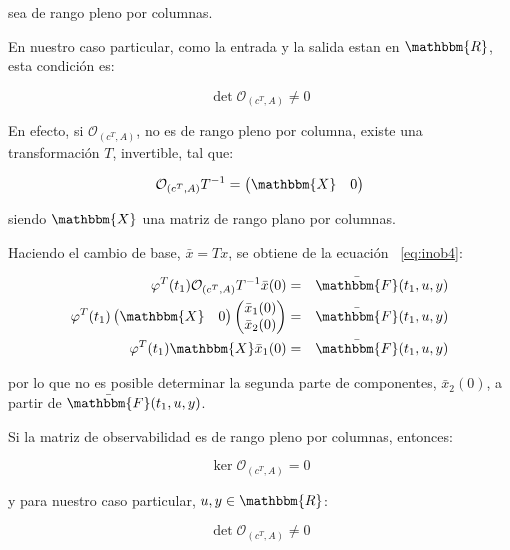 	sea de rango pleno por columnas.

	En nuestro caso particular, como la entrada y la salida estan en $\mathbbm{R}$, esta condición es:

	\begin{equation*}
		\det{\mathcal{O}_{(c^T, A)}} \ne 0
	\end{equation*}

	En efecto, si $\mathcal{O}_{(c^T, A)}$, no es de rango pleno por columna, existe una transformación $T$, invertible, tal que:

	\begin{equation*}
		\mathcal{O}_{(c^T, A)} T^{-1} =
		\begin{pmatrix}
			\mathbbm{X} & 0
		\end{pmatrix}
	\end{equation*}

	siendo $\mathbbm{X}$ una matriz de rango plano por columnas.

	Haciendo el cambio de base, $\bar{x} = T x$, se obtiene de la ecuación ~\ref{eq:inob4}:

	\begin{eqnarray*}
		\varphi^T(t_1) \mathcal{O}_{(c^T, A)} T^{-1} \bar{x}(0) & = & \bar{\mathbbm{F}}(t_1, u, y) \\
		\varphi^T(t_1)
		\begin{pmatrix}
		 	\mathbbm{X} & 0
		\end{pmatrix}
		\begin{pmatrix}
		 	\bar{x}_1(0) \\
		 	\bar{x}_2(0)
		\end{pmatrix} & = & \bar{\mathbbm{F}}(t_1, u, y) \\
		\varphi^T(t_1) \mathbbm{X} \bar{x}_1(0) & = & \bar{\mathbbm{F}}(t_1, u, y)
	\end{eqnarray*}

	por lo que no es posible determinar la segunda parte de componentes, $\bar{x}_2(0)$, a partir de $\bar{\mathbbm{F}}(t_1, u, y)$.

	Si la matriz de observabilidad es de rango pleno por columnas, entonces:

	\begin{equation*}
		\ker{\mathcal{O}_{(c^T, A)}} = {0}
	\end{equation*}

	y para nuestro caso particular, $u, y \in \mathbbm{R}$:

	\begin{equation*}
		\det{\mathcal{O}_{(c^T, A)}} \ne 0
	\end{equation*}

